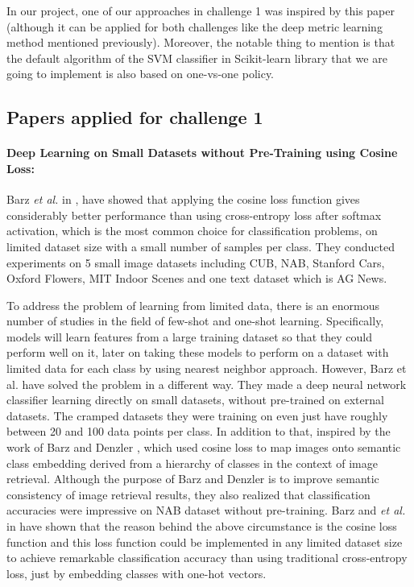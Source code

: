 \documentclass[10pt,twocolumn,letterpaper]{article}
\begin{document}
In our project, one of our approaches in challenge 1 was inspired by this paper (although it can be applied for both challenges like the deep metric learning method mentioned previously). Moreover, the notable thing to mention is that the default algorithm of the SVM classifier in Scikit-learn library that we are going to implement is also based on one-vs-one policy.



\subsection{Papers applied for challenge 1} 
\paragraph{Deep Learning on Small Datasets without Pre-Training using Cosine Loss:} Barz \textit{et al.} in \cite{cosine-loss}, have showed that applying the cosine loss function gives considerably better performance than using cross-entropy loss after softmax activation, which is the most common choice for classification problems, on limited dataset size with a small number of samples per class. They conducted experiments on 5 small image datasets including CUB, NAB, Stanford Cars, Oxford Flowers, MIT Indoor Scenes and one text dataset which is AG News.

To address the problem of learning from limited data, there is an enormous number of studies in the field of few-shot and one-shot learning. Specifically, models will learn features from a large training dataset so that they could perform well on it, later on taking these models to perform on a dataset with limited data for each class by using nearest neighbor approach. However, Barz et al. have solved the problem in a different way. They made a deep neural network classifier learning directly on small datasets, without pre-trained on external datasets. The cramped datasets they were training on even just have roughly between 20 and 100 data points per class. In addition to that, inspired by the work of Barz and Denzler \cite{8658633}, which used cosine loss to map images onto semantic class embedding derived from a hierarchy of classes in the context of image retrieval. Although the purpose of Barz and Denzler is to improve semantic consistency of image retrieval results, they also realized that classification accuracies were impressive on NAB dataset without pre-training. Barz and \textit{et al.} in \cite{cosine-loss} have shown that the reason behind the above circumstance is the cosine loss function and this loss function could be implemented in any limited dataset size to achieve remarkable classification accuracy than using traditional cross-entropy loss, just by embedding classes with one-hot vectors.
\end{document}
